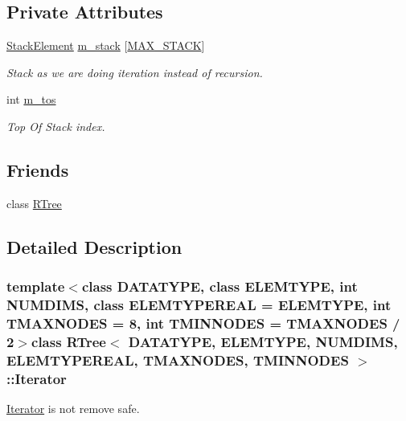\subsection*{Private Attributes}
\begin{DoxyCompactItemize}
\item 
\hyperlink{structRTree_1_1Iterator_1_1StackElement}{Stack\-Element} \hyperlink{classRTree_1_1Iterator_a71a0c70b553212a62c135343831f74b0}{m\-\_\-stack} \mbox{[}\hyperlink{classRTree_1_1Iterator_a1e45c4c1d6d735b999df1cbe1a0e36ada26b6ad9c0a591145b71370b87ce125e8}{M\-A\-X\-\_\-\-S\-T\-A\-C\-K}\mbox{]}
\begin{DoxyCompactList}\small\item\em Stack as we are doing iteration instead of recursion. \end{DoxyCompactList}\item 
int \hyperlink{classRTree_1_1Iterator_aa925698d64e938a5644b4ccdb247fd97}{m\-\_\-tos}
\begin{DoxyCompactList}\small\item\em Top Of Stack index. \end{DoxyCompactList}\end{DoxyCompactItemize}
\subsection*{Friends}
\begin{DoxyCompactItemize}
\item 
class \hyperlink{classRTree_1_1Iterator_af5d7fbb9e949ef77e8d3e32670fa9dd6}{R\-Tree}
\end{DoxyCompactItemize}


\subsection{Detailed Description}
\subsubsection*{template$<$class D\-A\-T\-A\-T\-Y\-P\-E, class E\-L\-E\-M\-T\-Y\-P\-E, int N\-U\-M\-D\-I\-M\-S, class E\-L\-E\-M\-T\-Y\-P\-E\-R\-E\-A\-L = E\-L\-E\-M\-T\-Y\-P\-E, int T\-M\-A\-X\-N\-O\-D\-E\-S = 8, int T\-M\-I\-N\-N\-O\-D\-E\-S = T\-M\-A\-X\-N\-O\-D\-E\-S / 2$>$class R\-Tree$<$ D\-A\-T\-A\-T\-Y\-P\-E, E\-L\-E\-M\-T\-Y\-P\-E, N\-U\-M\-D\-I\-M\-S, E\-L\-E\-M\-T\-Y\-P\-E\-R\-E\-A\-L, T\-M\-A\-X\-N\-O\-D\-E\-S, T\-M\-I\-N\-N\-O\-D\-E\-S $>$\-::\-Iterator}

\hyperlink{classRTree_1_1Iterator}{Iterator} is not remove safe. 

